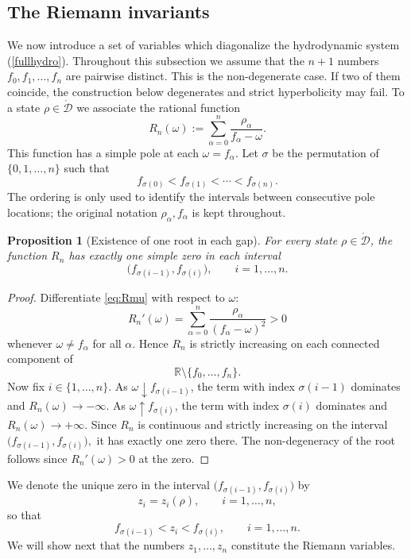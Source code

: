 \documentclass[12pt]{article}
\newtheorem{proposition}[theorem]{Proposition}
\newcommand{\eref}[1]{(\ref{#1})}
\newcommand{\R}{{\mathbb R}}
\begin{document}
\subsection{The Riemann invariants}
We now introduce a set of variables which diagonalize the hydrodynamic system
\eref{fullhydro}. Throughout this subsection we assume that the $n+1$ numbers $f_0,f_1,\dots,f_n$
are pairwise distinct. This is the non-degenerate case. If two of them coincide, the construction below degenerates and strict hyperbolicity may fail.
To a state $\rho\in\mathring{\mathcal D}$ we associate the rational function
\begin{equation}
R_n(\omega) := \sum_{\alpha=0}^n \frac{\rho_\alpha}{f_\alpha-\omega}.
\label{eq:Rmu}
\end{equation}
This function has a simple pole at each $\omega=f_\alpha$. Let $\sigma$ be the permutation of $\{0,1,\dots,n\}$ such that
\[
 f_{\sigma(0)} < f_{\sigma(1)} < \cdots < f_{\sigma(n)}.
\]
The ordering is only used to identify the intervals between consecutive pole locations; the original notation $\rho_\alpha,f_\alpha$ is kept throughout.

\begin{proposition}[Existence of one root in each gap]
For every state $\rho\in\mathring{\mathcal D}$, the function $R_n$ has exactly one simple zero in each interval
\[
\bigl(f_{\sigma(i-1)},f_{\sigma(i)}\bigr),
\qquad i=1,\dots,n.
\]
\end{proposition}

\begin{proof}
Differentiate \eqref{eq:Rmu} with respect to $\omega$:
\[
R_n'(\omega)=\sum_{\alpha=0}^n \frac{\rho_\alpha}{(f_\alpha-\omega)^2}>0
\]
whenever $\omega\neq f_\alpha$ for all $\alpha$. Hence $R_n$ is strictly increasing on each connected component of
\[
\R\setminus\{f_0,\dots,f_n\}.
\]
Now fix $i\in\{1,\dots,n\}$. As $\omega\downarrow f_{\sigma(i-1)}$, the term with index $\sigma(i-1)$ dominates and
$R_n(\omega)\to -\infty.$
As $\omega\uparrow f_{\sigma(i)}$, the term with index $\sigma(i)$ dominates and
$R_n(\omega)\to +\infty.$
Since $R_n$ is continuous and strictly increasing on the interval
$\bigl(f_{\sigma(i-1)},f_{\sigma(i)}\bigr),$
it has exactly one zero there. The non-degeneracy of the root follows since $R_n'(\omega)>0$ at the zero.
\end{proof}
We denote the unique zero in the interval
$\bigl(f_{\sigma(i-1)},f_{\sigma(i)}\bigr)$ by
\[
z_i=z_i(\rho),\qquad i=1,\dots,n,
\]
so that
\begin{equation}
 f_{\sigma(i-1)}<z_i<f_{\sigma(i)},
 \qquad i=1,\dots,n.
 \label{eq:r-domain}
\end{equation}
We will show next that the numbers $z_1,\dots,z_n$ constitute the Riemann variables.
\end{document}
